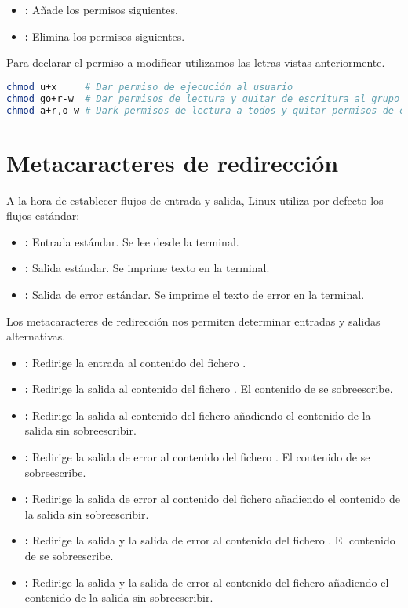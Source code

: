 \begin{itemize}
	\item\code{+}\textbf{:} Añade los permisos siguientes.
	\item\code{-}\textbf{:} Elimina los permisos siguientes.
\end{itemize}

Para declarar el permiso a modificar utilizamos las letras  vistas anteriormente.

\begin{lstlisting}[language=sh]
chmod u+x     # Dar permiso de ejecución al usuario
chmod go+r-w  # Dar permisos de lectura y quitar de escritura al grupo y a otros
chmod a+r,o-w # Dark permisos de lectura a todos y quitar permisos de escritura a otros
\end{lstlisting}

\section{Metacaracteres de redirección}

A la hora de establecer flujos de entrada y salida, Linux utiliza por defecto los flujos estándar:

\begin{itemize}
	\item{}\textbf{:} Entrada estándar. Se lee desde la terminal.
	\item{}\textbf{:} Salida estándar. Se imprime texto en la terminal.
	\item{}\textbf{:} Salida de error estándar. Se imprime el texto de error en la terminal.
\end{itemize}

Los metacaracteres de redirección nos permiten determinar entradas y salidas alternativas.

\begin{itemize}
	\item{}\textbf{:} Redirige la entrada al contenido del fichero .
	\item{}\textbf{:} Redirige la salida al contenido del fichero . El contenido de  se sobreescribe.
	\item{}\textbf{:} Redirige la salida al contenido del fichero  añadiendo el contenido de la salida sin sobreescribir.
	\item{}\textbf{:} Redirige la salida de error al contenido del fichero . El contenido de  se sobreescribe.
	\item{}\textbf{:} Redirige la salida de error al contenido del fichero  añadiendo el contenido de la salida sin sobreescribir.
	\item{}\textbf{:} Redirige la salida y la salida de error al contenido del fichero . El contenido de  se sobreescribe.
	\item{}\textbf{:} Redirige la salida y la salida de error al contenido del fichero  añadiendo el contenido de la salida sin sobreescribir.
\end{itemize}

